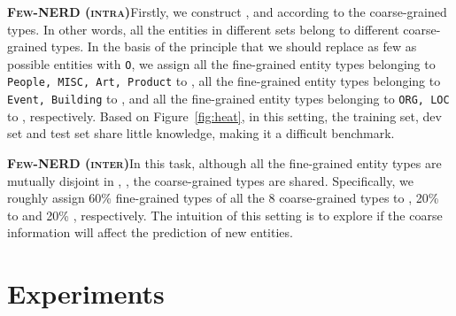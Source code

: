 \documentclass[11pt,a4paper, dvipsnames]{article}
\begin{document}
\noindent\textbf{\textsc{Few-NERD (intra)}}\quad Firstly, we construct ,  and  according to the coarse-grained types. In other words, all the entities in different sets belong to different coarse-grained types. In the basis of the principle that we should replace as few as possible entities with \texttt{O}, we assign all the fine-grained entity types belonging to \texttt{People, MISC, Art, Product} to , all the fine-grained entity types belonging to \texttt{Event, Building} to  , and all the fine-grained entity types belonging to \texttt{ORG, LOC} to  , respectively. Based on Figure~\ref{fig:heat}, in this setting, the training set, dev set and test set share little knowledge, making it a difficult benchmark.

\noindent\textbf{\textsc{Few-NERD (inter)}}\quad In this task, although all the fine-grained entity types are mutually disjoint in , , the coarse-grained types are shared. Specifically, we roughly assign 60\% fine-grained types of all the 8 coarse-grained types to , 20\% to  and 20\% , respectively. The intuition of this setting is to explore if the coarse information will affect the prediction of new entities.








\begin{table}[]
    \centering
    \caption{Statistics of train, dev and test sets for three tasks of  We remove the sentences with no entities for the few-shot benchmarks.}
    \label{tab:stats_bench}
    \vspace{-0.3cm}
\end{table}







\section{Experiments}
\end{document}
